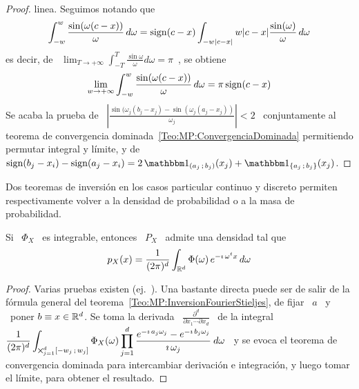 {\begin{proof}
  linea. Seguimos notando que
  \[
  \int_{-w}^w  \frac{\sin(\omega (c  - x))}{\omega}  \, d\omega  = \operatorname{sign}(c  - x)
  \int_{-w |c - x|}{w |c - x|} \frac{\sin(\omega)}{\omega} \, d\omega
  \]
  es  decir, de  \ $\displaystyle  \lim_{T \to  +\infty}  \int_{-T}^T \frac{\sin
    \omega}{\omega} d\omega = \pi$~\cite[Ec.~3.721]{GraRyz15}, se obtiene
  \[
  \lim_{w \to  +\infty} \int_{-w}^w \frac{\sin(\omega  (c - x))}{\omega}
  \, d\omega = \pi \operatorname{sign}(c-x)
  \]
  Se  acaba  la   prueba  de  \  $\left|  \frac{\sin(\omega_j   (b_j  -  x_j)  -
      \sin(\omega_j  (a_j -  x_j))}{\omega_j} \right|  < 2$  \  conjuntamente al
  teorema de convergencia dominada~\ref{Teo:MP:ConvergenciaDominada} permitiendo
  permutar integral  y l\'imite,  y de $\sign(b_j-x_i)  - \sign(a_j-x_i) =  2 \,
  \un_{\left(   a_j   \;  b_j   \right)}(x_j)   +   \un_{\left\{   a_j  \;   b_j
    \right\}}(x_j)$.
\end{proof}

Dos teoremas de inversi\'on en los casos particular continuo y discreto permiten
respectivamente  volver  a   la  densidad  de  probabilidad  o   a  la  masa  de
probabilidad.
%
\begin{teorema}\label{Teo:MP:InversionDensidad}
%
  Si \ $\Phi_X$ \ es integrable, entonces \ $P_X$ \ admite una densidad tal que
  \[
  p_X(x)  =  \frac{1}{(2  \pi)^d}  \int_{\mathbb{R}^d} \Phi(\omega) \, e^{-  \imath  \,
    \omega^t x} \, d\omega
\]
\end{teorema}
%
\begin{proof}
  Varias pruebas  existen (ej.~\cite[p.~21]{Sas13}). Una  bastante directa puede
  ser       de      salir      de       la      f\'ormula       general      del
  teorema~\ref{Teo:MP:InversionFourierStieljes}, de  fijar \ $a$ \ y  \ poner $b
  \equiv x \in  \mathbb{R}^d$. Se toma la derivada  \ $\frac{\partial^d}{\partial x_1
    \cdots \partial x_d}$ \ de  la integral \ $\displaystyle \frac{1}{(2 \pi)^d}
  \int_{\operatorname*{\bigtimes}_{j=1}^d   [-w_j  \, ; \,  w_j]}   \Phi_X(\omega)  \prod_{j   =  1}^d
  \frac{e^{- \imath \,  a_j \omega_j} - e^{- \imath  \, b_j \omega_j}}{\imath \,
    \omega_j} \: d\omega$ \ y se  evoca el teorema de convergencia dominada para
  intercambiar  derivaci\'on e integraci\'on,  y luego  tomar el  l\'imite, para
  obtener el resultado.
\end{proof}

}

